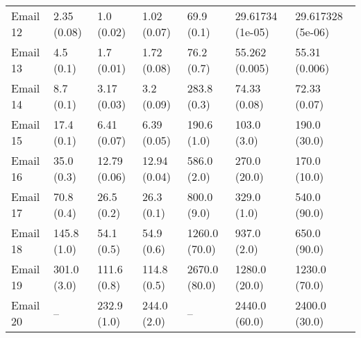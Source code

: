 \begin{tabular}{lllllll}
Email 12 &       2.35 (0.08) &         1.0 (0.02) &           1.02 (0.07) &              69.9 (0.1) &         29.61734 (1e-05) &           29.617328 (5e-06) \\
Email 13 &         4.5 (0.1) &         1.7 (0.01) &           1.72 (0.08) &              76.2 (0.7) &           55.262 (0.005) &               55.31 (0.006) \\
Email 14 &         8.7 (0.1) &        3.17 (0.03) &            3.2 (0.09) &             283.8 (0.3) &             74.33 (0.08) &                72.33 (0.07) \\
Email 15 &        17.4 (0.1) &        6.41 (0.07) &           6.39 (0.05) &             190.6 (1.0) &              103.0 (3.0) &                190.0 (30.0) \\
Email 16 &        35.0 (0.3) &       12.79 (0.06) &          12.94 (0.04) &             586.0 (2.0) &             270.0 (20.0) &                170.0 (10.0) \\
Email 17 &        70.8 (0.4) &         26.5 (0.2) &            26.3 (0.1) &             800.0 (9.0) &              329.0 (1.0) &                540.0 (90.0) \\
Email 18 &       145.8 (1.0) &         54.1 (0.5) &            54.9 (0.6) &           1260.0 (70.0) &              937.0 (2.0) &                650.0 (90.0) \\
Email 19 &       301.0 (3.0) &        111.6 (0.8) &           114.8 (0.5) &           2670.0 (80.0) &            1280.0 (20.0) &               1230.0 (70.0) \\
Email 20 &                -- &        232.9 (1.0) &           244.0 (2.0) &                      -- &            2440.0 (60.0) &               2400.0 (30.0) \\
\bottomrule
\end{tabular}
